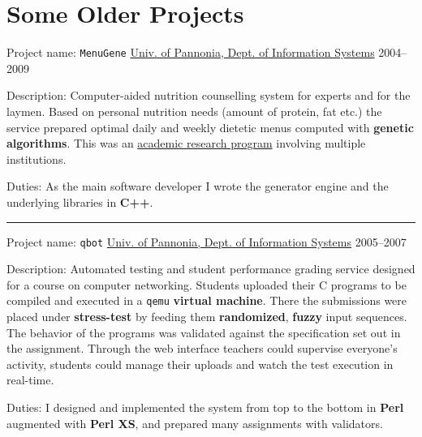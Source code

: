 \documentclass[a4paper,12pt]{article}
\newcommand\Yell{\textbf}
\newcommand\Label{\textsf}
\newcommand{\midline}{\rule[0.5ex]{\linewidth-\parindent}{.5pt}}
\begin{document}
\section{Some Older Projects}

\Label{Project name}: \texttt{MenuGene}\hfill
\href{http://virt.uni-pannon.hu/index.php/en/}%
{Univ. of Pannonia, Dept. of Information Systems}
\Label{2004--2009}\par\medskip
\Label{Description}: Computer-aided nutrition counselling system for experts
and for the laymen.  Based on personal nutrition needs (amount of protein,
fat etc.) the service prepared optimal daily and weekly dietetic menus
computed with \Yell{genetic algorithms}.  This was an
\href{https://github.com/enadam/thesis/raw/master/thesis.pdf}%
{academic research program} involving multiple institutions.\par\medskip
\Label{Duties}: As the main software developer I wrote the generator engine
and the underlying libraries in \Yell{C++}.

\midline\par
\Label{Project name}: \texttt{qbot}\hfill
\href{http://virt.uni-pannon.hu/index.php/en/}%
{Univ. of Pannonia, Dept. of Information Systems}
\Label{2005--2007}\par\medskip
\Label{Description}: Automated testing and student performance grading
service designed for a course on computer networking.  Students uploaded
their C programs to be compiled and executed in a \texttt{qemu} \Yell{virtual
machine}.  There the submissions were placed under \Yell{stress-test} by
feeding them \Yell{randomized}, \Yell{fuzzy} input sequences.  The behavior
of the programs was validated against the specification set out in the
assignment.  Through the web interface teachers could supervise everyone's
activity, students could manage their uploads and watch the test execution
in real-time.
\par\medskip
\Label{Duties}: I designed and implemented the system from top to the bottom
in \Yell{Perl} augmented with \Yell{Perl XS}, and prepared many assignments
with validators.
\end{document}
